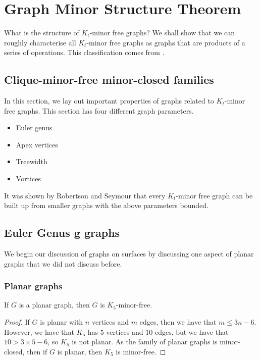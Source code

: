 
\section{Graph Minor Structure Theorem}\label{sec:Kt_Minor_Free}
What is the structure of $K_t$-minor free graphs? We shall show that we can roughly characterise all $K_t$-minor free graphs as graphs that are products of a series of operations. This classification comes from \cite{robertsonGraphMinorsXVI2003}.
\subsection{Clique-minor-free minor-closed families}\label{ssec:Kt_Minor_Closed_families}
In this section, we lay out important properties of graphs related to $K_t$-minor free graphs. This section has four different graph parameters.
\begin{itemize}
	\item Euler genus
	\item Apex vertices
	\item Treewidth
	\item Vortices
\end{itemize}
It was shown by Robertson and Seymour \cite{robertsonGraphMinorsXX2004} that every $K_t$-minor free graph can be built up from smaller graphs with the above parameters bounded.
\subsection{Euler Genus g graphs}
We begin our discussion of graphs on surfaces by discussing one aspect of planar graphs that we did not discuss before. 
\subsubsection{Planar graphs}\label{sssec:K_5-free_Planar}
\begin{theorem}\label{thm:K5_Free_Planar}
	If $G$ is a planar graph, then $G$ is $K_5$-minor-free.
\end{theorem}
\begin{proof}
	If $G$ is planar with $n$ vertices and $m$ edges, then we have that $m \leq 3n -6$. However, we have that $K_5$ has $5$ vertices and $10$ edges, but we have that $ 10 > 3 \times 5 - 6$, so $K_5$ is not planar. As the family of planar graphs is minor-closed, then if $G$ is planar, then $K_5$ is minor-free.
\end{proof}

